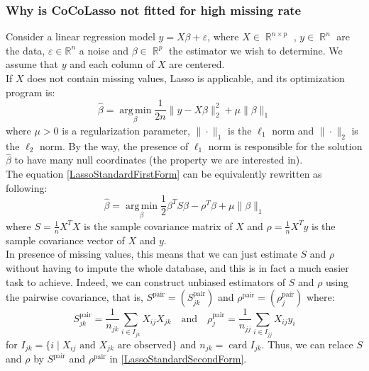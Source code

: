 \documentclass[]{article}
\DeclareMathOperator*{\argmin}{arg\,min}
\DeclareMathOperator*{\card}{\mathrm{card}}
\DeclareMathOperator*{\R}{\mathbb{R}}
\begin{document}
\subsubsection{Why is CoCoLasso not fitted for high missing rate}
Consider a linear regression model $y = X\beta + \varepsilon$, where $X\in \R^{n\times p}$ , $y\in \R^n$ are the data, $\varepsilon\in \mathbb{R}^n$ a noise and $\beta\in \R^p$ the estimator we wish to determine. We assume that $y$ and each column of $X$ are centered.\\
If $X$ does not contain missing values, Lasso is applicable, and its optimization program is:
\begin{equation}
	\label{LassoStandardFirstForm}
	\hat{\beta} = \argmin\limits_{\beta} \frac{1}{2n}\|y - X\beta\|_2^2 + \mu \|\beta\|_1
\end{equation}
where $\mu > 0$ is a regularization parameter, $\|\cdot\|_1$ is the $\ell_1$ norm and $\|\cdot\|_2$ is the $\ell_2$ norm.
By the way, the presence of $\ell_1$ norm is responsible for the solution $\hat{\beta}$ to have many null coordinates (the property we are interested in).\\
The equation \eqref{LassoStandardFirstForm} can be equivalently rewritten as following:
\begin{equation}
	\label{LassoStandardSecondForm}
	\hat{\beta} = \argmin\limits_{\beta} \frac{1}{2}\beta^T S\beta - \rho^T\beta + \mu \|\beta\|_1
\end{equation}
where $S=\frac{1}{n}X^TX$ is the sample covariance matrix of $X$ and $\rho = \frac{1}{n}X^Ty$ is the sample covariance vector of $X$ and $y$.\\
In presence of missing values, this means that we can just estimate $S$ and $\rho$ without having to impute the whole database, and this is in fact a much easier task to achieve. Indeed,  we can construct unbiased estimators of $S$ and $\rho$ using the pairwise covariance, that is, $S^{\text{pair}} = (S^{\text{pair}}_{jk})$ and $\rho^{\text{pair}} = (\rho^{\text{pair}}_{j})$ where:
\begin{equation}
	S^{\text{pair}}_{jk} = \frac{1}{n_{jk}} \sum_{i \in I_{jk}} X_{ij}X_{jk} \quad \text{and}\quad \rho^{\text{pair}}_{j} = \frac{1}{n_{jj}} \sum_{i \in I_{jj}} X_{ij}y_i
\end{equation}
for $I_{jk} = \{i\mid \text{$X_{ij}$ and $X_{jk}$ are observed}\}$ and $n_{jk} = \card I_{jk}$. Thus, we can relace $S$ and $\rho$ by $S^{\text{pair}}$ and $\rho^{\text{pair}}$ in \eqref{LassoStandardSecondForm}.\\
\end{document}

